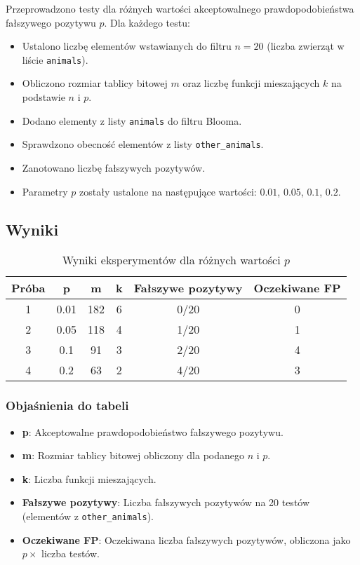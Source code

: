 \documentclass{article}
\begin{document}
Przeprowadzono testy dla różnych wartości akceptowalnego prawdopodobieństwa fałszywego pozytywu $p$. Dla każdego testu:
\begin{itemize}
    \item Ustalono liczbę elementów wstawianych do filtru $n = 20$ (liczba zwierząt w liście \texttt{animals}).
    \item Obliczono rozmiar tablicy bitowej $m$ oraz liczbę funkcji mieszających $k$ na podstawie $n$ i $p$.
    \item Dodano elementy z listy \texttt{animals} do filtru Blooma.
    \item Sprawdzono obecność elementów z listy \texttt{other\_animals}.
    \item Zanotowano liczbę fałszywych pozytywów.
    \item Parametry $p$ zostały ustalone na następujące wartości: $0.01$, $0.05$, $0.1$, $0.2$.

\end{itemize}

\subsection{Wyniki}

\begin{table}[H]
\centering
\begin{tabular}{cccccc}
\toprule
\textbf{Próba} & \textbf{p} & \textbf{m} & \textbf{k} & \textbf{Fałszywe pozytywy} & \textbf{Oczekiwane FP} \\
\midrule
1 & 0.01 & 182 & 6 & 0/20 & 0 \\
2 & 0.05 & 118 & 4 & 1/20 & 1 \\
3 & 0.1 & 91 & 3 & 2/20 & 4 \\
4 & 0.2 & 63 & 2 & 4/20 & 3 \\
\bottomrule
\end{tabular}
\caption{Wyniki eksperymentów dla różnych wartości $p$}
\end{table}

\subsubsection*{Objaśnienia do tabeli}
\begin{itemize}
    \item \textbf{p}: Akceptowalne prawdopodobieństwo fałszywego pozytywu.
    \item \textbf{m}: Rozmiar tablicy bitowej obliczony dla podanego $n$ i $p$.
    \item \textbf{k}: Liczba funkcji mieszających.
    \item \textbf{Fałszywe pozytywy}: Liczba fałszywych pozytywów na 20 testów (elementów z \texttt{other\_animals}).
    \item \textbf{Oczekiwane FP}: Oczekiwana liczba fałszywych pozytywów, obliczona jako $p \times$ liczba testów.
\end{itemize}
\end{document}
